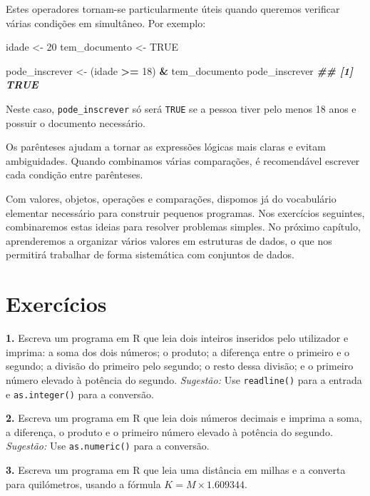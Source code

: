 \documentclass[
  portuguese,
  11pt,
  openany]{book}
\newenvironment{Shaded}{\begin{snugshade}}{\end{snugshade}}
\newcommand{\ConstantTok}[1]{\textcolor[rgb]{0.56,0.35,0.01}{#1}}
\newcommand{\DecValTok}[1]{\textcolor[rgb]{0.00,0.00,0.81}{#1}}
\newcommand{\DocumentationTok}[1]{\textcolor[rgb]{0.56,0.35,0.01}{\textbf{\textit{#1}}}}
\newcommand{\NormalTok}[1]{#1}
\newcommand{\OtherTok}[1]{\textcolor[rgb]{0.56,0.35,0.01}{#1}}
\newcommand{\SpecialCharTok}[1]{\textcolor[rgb]{0.81,0.36,0.00}{\textbf{#1}}}
\begin{document}
Estes operadores tornam-se particularmente úteis quando queremos verificar várias condições em simultâneo. Por exemplo:

\begin{Shaded}
\begin{Highlighting}[]
\NormalTok{idade }\OtherTok{\textless{}{-}} \DecValTok{20}
\NormalTok{tem\_documento }\OtherTok{\textless{}{-}} \ConstantTok{TRUE}

\NormalTok{pode\_inscrever }\OtherTok{\textless{}{-}}\NormalTok{ (idade }\SpecialCharTok{\textgreater{}=} \DecValTok{18}\NormalTok{) }\SpecialCharTok{\&}\NormalTok{ tem\_documento}
\NormalTok{pode\_inscrever}
\DocumentationTok{\#\# [1] TRUE}
\end{Highlighting}
\end{Shaded}

Neste caso, \texttt{pode\_inscrever} só será \texttt{TRUE} se a pessoa tiver pelo menos 18 anos e possuir o documento necessário.

Os parênteses ajudam a tornar as expressões lógicas mais claras e evitam ambiguidades. Quando combinamos várias comparações, é recomendável escrever cada condição entre parênteses.

Com valores, objetos, operações e comparações, dispomos já do vocabulário elementar necessário para construir pequenos programas. Nos exercícios seguintes, combinaremos estas ideias para resolver problemas simples. No próximo capítulo, aprenderemos a organizar vários valores em estruturas de dados, o que nos permitirá trabalhar de forma sistemática com conjuntos de dados.

\section{Exercícios}\label{exercuxedcios}

\textbf{1.} Escreva um programa em R que leia dois inteiros inseridos pelo utilizador e imprima: a soma dos dois números; o produto; a diferença entre o primeiro e o segundo; a divisão do primeiro pelo segundo; o resto dessa divisão; e o primeiro número elevado à potência do segundo.
\emph{Sugestão:} Use \texttt{readline()} para a entrada e \texttt{as.integer()} para a conversão.

\textbf{2.} Escreva um programa em R que leia dois números decimais e imprima a soma, a diferença, o produto e o primeiro número elevado à potência do segundo.
\emph{Sugestão:} Use \texttt{as.numeric()} para a conversão.

\textbf{3.} Escreva um programa em R que leia uma distância em milhas e a converta para quilómetros, usando a fórmula \(K = M \times 1.609344\).
\end{document}
